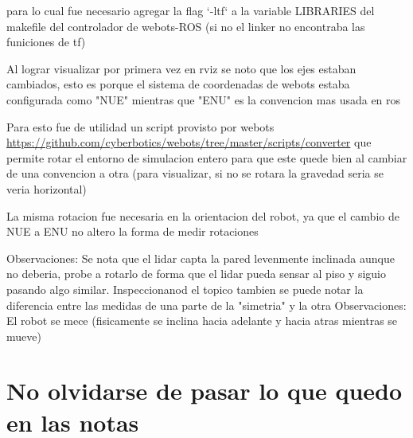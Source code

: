 para lo cual fue necesario agregar la flag `-ltf` a la variable LIBRARIES del makefile del controlador de webots-ROS (si no el linker no encontraba las funiciones de tf)

Al lograr visualizar por primera vez en rviz se noto que los ejes estaban cambiados, esto es porque el sistema de coordenadas de webots estaba configurada como "NUE" mientras que "ENU" es la convencion mas usada en ros

Para esto fue de utilidad un script provisto por webots \url{https://github.com/cyberbotics/webots/tree/master/scripts/converter} que permite rotar el entorno de simulacion entero para que este quede bien al cambiar de una convencion a otra (para visualizar, si no se rotara la gravedad seria se veria horizontal)

La misma rotacion fue necesaria en la orientacion del robot, ya que el cambio de NUE a ENU no altero la forma de medir rotaciones

Observaciones: Se nota que el lidar capta la pared levenmente inclinada aunque no deberia, probe a rotarlo de forma que el lidar pueda sensar al piso y siguio pasando algo similar. Inspeccionanod el topico tambien se puede notar la diferencia entre las medidas de una parte de la "simetria" y la otra
Observaciones: El robot se mece (fisicamente se inclina hacia adelante y hacia atras mientras se mueve)

\section{No olvidarse de pasar lo que quedo en las notas}
